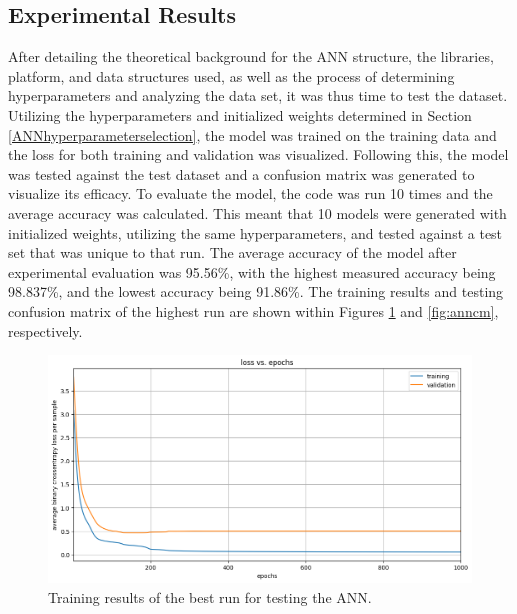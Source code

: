 \documentclass[a4paper]{article}
\begin{document}
\subsection{Experimental Results}

After detailing the theoretical background for the ANN structure, the libraries, platform, and data structures used, as well as the process of determining hyperparameters and analyzing the data set, it was thus time to test the dataset. Utilizing the hyperparameters and initialized weights determined in Section \ref{ANNhyperparameterselection}, the model was trained on the training data and the loss for both training and validation was visualized. Following this, the model was tested against the test dataset and a confusion matrix was generated to visualize its efficacy. To evaluate the model, the code was run 10 times and the average accuracy was calculated. This meant that 10 models were generated with initialized weights, utilizing the same hyperparameters, and tested against a test set that was unique to that run. The average accuracy of the model after experimental evaluation was 95.56\%, with the highest measured accuracy being 98.837\%, and the lowest accuracy being 91.86\%. The training results and testing confusion matrix of the highest run are shown within Figures \ref{fig:anntrain} and \ref{fig:anncm}, respectively. 

\begin{figure}[h!]
    \centering
    \includegraphics[width=0.9\linewidth]{images/ANNtrain.png}
    \caption{Training results of the best run for testing the ANN.}
    \label{fig:anntrain}
\end{figure}
\end{document}

